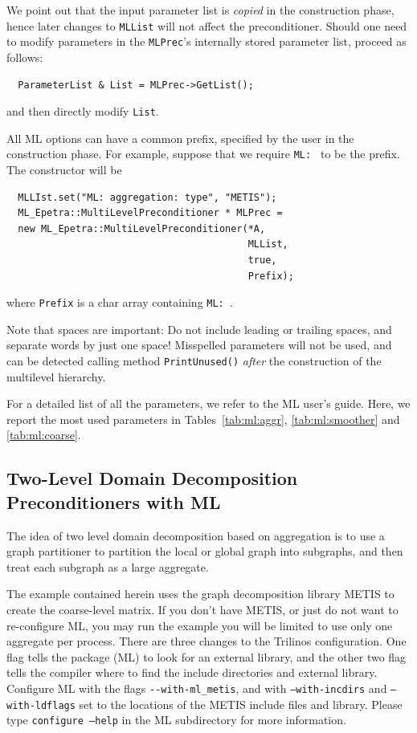 We point out that the input parameter list is {\sl copied} in the
construction phase, hence later changes to \verb!MLList! will not affect
the preconditioner. Should one need to modify parameters in the
\verb!MLPrec!'s internally stored parameter list, proceed as
follows:
\begin{verbatim}
  ParameterList & List = MLPrec->GetList();
\end{verbatim}
and then directly modify \verb!List!.

\medskip

All ML options can have a common prefix, specified by the
user in the construction phase. For example, suppose that we require
\verb!ML: ! to be the prefix. The constructor will be
\begin{verbatim}
  MLLIst.set("ML: aggregation: type", "METIS");
  ML_Epetra::MultiLevelPreconditioner * MLPrec = 
  new ML_Epetra::MultiLevelPreconditioner(*A,  
                                          MLList, 
                                          true, 
                                          Prefix);
\end{verbatim}
where \verb!Prefix! is a char array containing \verb!ML: !.

Note that spaces are important: Do not include leading or trailing
spaces, and separate words by just one space! Misspelled parameters will
not be used, and can be detected calling method \verb!PrintUnused()!
{\sl after} the construction of the multilevel hierarchy. 

For a detailed list of all the parameters, we refer to the ML user's
guide.  Here, we report the most used parameters in
Tables~\ref{tab:ml:aggr}, \ref{tab:ml:smoother} and \ref{tab:ml:coarse}.




\subsection{Two-Level Domain Decomposition Preconditioners with ML}
\label{sec:ml_DD}

The idea of two level domain decomposition based on aggregation is to
use a graph partitioner to partition the local or global graph into
subgraphs, and then treat each subgraph as a large aggregate.

The example contained herein 
uses the graph decomposition library METIS to create the coarse-level matrix.
If you don't have METIS, or just do not want to
re-configure ML, you may run the example 
you will be limited to use only one aggregate per process.
There are three changes to the Trilinos configuration.
One flag tells the package (ML) to look for an external library,
and the other two flag tells the compiler
where to find the include directories and external library.
Configure ML with the flags \verb!--with-ml_metis!,
and with {\tt --with-incdirs} and {\tt --with-ldflags}
set to the locations of the METIS include files and library. 
Please type {\tt configure --help} in the ML subdirectory for more information. 

